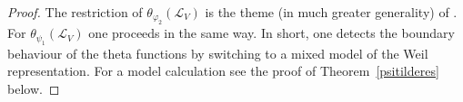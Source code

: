 \documentclass[12pt,leqno]{amsart}
\numberwithin{equation}{section}
\theoremstyle{plain}
\theoremstyle{definition}
\theoremstyle{remark}
\newcommand{\Z}{\mathbb{Z}}
\newcommand{\calL}{\mathcal{L}}
\begin{document}
\begin{proof}
The restriction of $\theta_{\varphi_2}(\calL_V)$ is the theme (in much greater generality) of \cite{FMres}. For $\theta_{\psi_1}(\calL_V)$ one proceeds in the same way. In short, one detects the boundary behaviour of the theta functions by switching to a mixed model of the Weil representation. For a model calculation see the proof of Theorem~\ref{psitilderes} below. 
 \begin{comment}
 We assume for simplicity that $L = \Z u + L_W + \Z u'$ and that $h=0$. We first note that it suffices to consider the limit $t \to \infty$ for $z=z(t,0,0)$.  We have for the Gaussian $\varphi_0(x,z) = \exp\left(-\pi[ t^{-2}y_1^2+ 2q(x')+t^2y_1'^2]\right)$ with $x = y_1u+x'+y_1'u' \in V$, where $x' \in W$. Hence when taking the limit $t \to \infty$ all components of $\theta(\tau,\psi_1^V,\calL_V)$ vanish unless $y'=0$. We can also ignore the summation over $L_W$ for the moment, since it is unaffected by $t$. One then applies Poisson summation on the sum over $y_1$ to apply the result. 
Hence it suffices to consider for fixed $x' \in W$ the sum
\begin{align*} 
\sum_{k \in \Z} \psi(ku+x',z(t,s,w)) & = 
\sum_{k \in \Z} -\frac12t^{-1}k(x,x(s)) \exp\left(-\pi[ t^{-2}k^2+ 2q(x')]\right) \frac{dt}{t}  \\
& + \sum_{k \in \Z} \frac12t^{-2}k^2\exp\left(-\pi[ t^{-2}k^2+ 2q(x')]\right)  \frac{1}{\sqrt{2}} \frac{dw_3}{ts?} \\
&+ \sum_{k \in \Z} -(x,x'(s))(x,x(s)) \exp\left(-\pi[ t^{-2}k^2+ 2q(x')]\right)  \frac{1}{\sqrt{2}} \frac{dw_2}{ts?} \\
& + \sum_{k \in \Z} -\frac12t^{-1}k(x,x'(s) \exp\left(-\pi[ t^{-2}k^2+ 2q(x')]\right) {ds}.
\end{align*}
Applying Poisson summation then yields
\begin{align*} 
\sum_{k \in \Z} \psi(ku+x',z(t,s,w)) & = 
\sum_{k \in \Z} -\frac12tk(x,x(s)) \exp\left(-\pi[ t^{2}k^2+ 2q(x')]\right) {dt}  \\
& + \sum_{k \in \Z} \frac12(2t^{2}k^2-\frac1{\pi}) \exp\left(-\pi[ t^{2}k^2+ 2q(x')]\right)  \frac{1}{\sqrt{2}} \frac{dw_3}{s?} \\
&+ \sum_{k \in \Z} -(x,x'(s))(x,x(s)) \exp\left(-\pi[ t^{2}k^2+ 2q(x')]\right)  \frac{1}{\sqrt{2}} \frac{dw_2}{s?} \\
& + \sum_{k \in \Z} -\frac12t^2k(x,x'(s)) \exp\left(-\pi[ t^{2}k^2+ 2q(x')]\right) {ds}.
\end{align*}
Now taking the limit $t \to \infty$ gives the claim. {\bf CHECK THE SIGN!}
\end{comment}
\end{proof}
\end{document}
